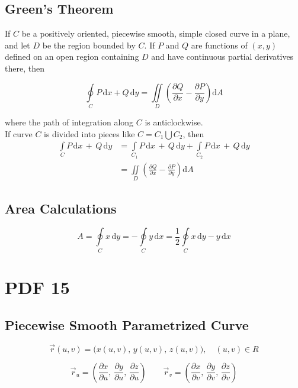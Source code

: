 \documentclass[12pt, fleqn]{book}
\newcommand{\D}{\mathrm{d}}
\newcommand{\ic}{\int\limits_C}
\newcommand{\oic}{\oint\limits_C}
\newcommand{\xy}{(x, y)}
\newcommand{\uv}{(u, v)}
\newcommand{\rond}[2]{\frac{\partial #1}{\partial #2}}
\begin{document}
		\section{Green's Theorem}
			If $C$ be a positively oriented, piecewise smooth, simple closed curve in a plane, and let $D$ be the region bounded by $C$. If $P$ and $Q$ are functions of $\xy$ defined on an open region containing $D$ and have continuous partial derivatives there, then 
			
			\begin{equation}
				\oic  P \, \D x + Q \, \D y = \iint\limits_D \left(\rond{Q}{x} - \rond{P}{y}\right) \D A
			\end{equation}
		
		    where the path of integration along $C$ is anticlockwise. \\
		    
		    If curve $C$ is divided into pieces like $C = C_1 \bigcup C_2$, then
		    \begin{equation}
		    	\begin{split}
		    		\ic  P \, \D x \, + \, Q \, \D y & = \int\limits_{C_{1}} P \, \D x \, + \, Q \, \D y + \int\limits_{C_{2}} P \, \D x \, + \, Q \, \D y \\ 
		    		& = \iint\limits_D \left(\rond{Q}{x} - \rond{P}{y}\right) \D A
		    	\end{split}
		    \end{equation}		    
		\section{Area Calculations}
			\begin{equation}
				A = \oic  x \, \D y = - \oic  y \, \D x = \frac{1}{2} \oic  x \, \D y - y \, \D x
			\end{equation}		
\chapter{PDF 15}\label{pdf15}
	\section{Piecewise Smooth Parametrized Curve}
		\begin{equation}
			\vec{r}\uv = \big(x\uv, \, y\uv, \, z\uv\big), \quad \uv \in R
		\end{equation}

		\begin{equation}
			\vec{r}_u = (\rond{x}{u}, \, \rond{y}{u}, \, \rond{z}{u}) \qquad \vec{r}_v = (\rond{x}{v}, \, \rond{y}{v}, \, \rond{z}{v}) 
		\end{equation}	
\end{document}
